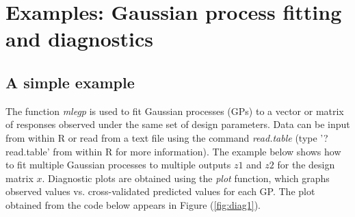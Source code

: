 

\section{Examples: Gaussian process fitting and diagnostics}
%
\subsection{A simple example}
The function {\it mlegp} is used to fit Gaussian processes (GPs) to a vector or matrix of responses observed under the same set of design parameters. Data can be input from within R or read from a text file using the command {\it read.table} (type '?read.table' from within R for more information). The example below shows how to fit multiple Gaussian processes to multiple outputs $z1$ and $z2$ for the design matrix $x$.
Diagnostic plots are obtained using the {\it plot} function, which graphs observed values vs. cross-validated predicted values for each GP. The plot obtained from the code below appears in Figure (\ref{fig:diag1}).

